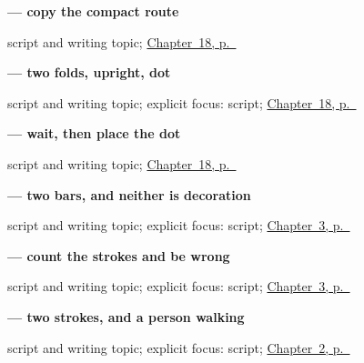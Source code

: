 \noindent\begin{minipage}[t]{\linewidth}
\raggedright
\textbf{ — copy the compact route}\par
\footnotesize script and writing topic; \hyperref[ch:zh-looking-reading]{Chapter~18, p.~\pageref*{ch:zh-looking-reading}}
\end{minipage}\par\smallskip

\noindent\begin{minipage}[t]{\linewidth}
\raggedright
\textbf{ — two folds, upright, dot}\par
\footnotesize script and writing topic; explicit focus: script; \hyperref[ch:zh-looking-reading]{Chapter~18, p.~\pageref*{ch:zh-looking-reading}}
\end{minipage}\par\smallskip

\noindent\begin{minipage}[t]{\linewidth}
\raggedright
\textbf{ — wait, then place the dot}\par
\footnotesize script and writing topic; \hyperref[ch:zh-looking-reading]{Chapter~18, p.~\pageref*{ch:zh-looking-reading}}
\end{minipage}\par\smallskip

\noindent\begin{minipage}[t]{\linewidth}
\raggedright
\textbf{ — two bars, and neither is decoration}\par
\footnotesize script and writing topic; explicit focus: script; \hyperref[ch:zh-numbers]{Chapter~3, p.~\pageref*{ch:zh-numbers}}
\end{minipage}\par\smallskip

\noindent\begin{minipage}[t]{\linewidth}
\raggedright
\textbf{ — count the strokes and be wrong}\par
\footnotesize script and writing topic; explicit focus: script; \hyperref[ch:zh-numbers]{Chapter~3, p.~\pageref*{ch:zh-numbers}}
\end{minipage}\par\smallskip

\noindent\begin{minipage}[t]{\linewidth}
\raggedright
\textbf{ — two strokes, and a person walking}\par
\footnotesize script and writing topic; explicit focus: script; \hyperref[ch:zh-components]{Chapter~2, p.~\pageref*{ch:zh-components}}
\end{minipage}\par\smallskip

